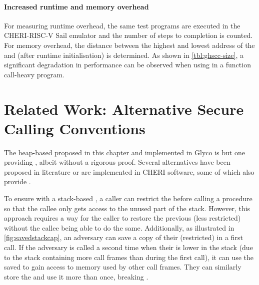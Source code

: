 \documentclass[main.tex]{subfiles}
\begin{document}
\paragraph{Increased runtime and memory overhead} For measuring runtime overhead, the same test programs are executed in the CHERI-RISC-V Sail emulator and the number of steps to completion is counted. For memory overhead, the distance between the highest and lowest address of the  and  (after runtime initialisation) is determined. As shown in \cref{tbl:ghscc-size}, a significant degradation in performance can be observed when using  in a function call-heavy program.

\section{Related Work: Alternative Secure Calling Conventions} \label{sct:alt-scc}
The heap-based  proposed in this chapter and implemented in Glyco is but one  providing , albeit without a rigorous proof. Several alternatives have been proposed in literature or are implemented in CHERI software, some of which also provide .

To ensure  with a stack-based , a caller can restrict the  before calling a procedure so that the callee only gets access to the unused part of the stack. However, this approach requires a way for the caller to restore the previous (less restricted)  without the callee being able to do the same. Additionally, as illustrated in \cref{fig:savedstackcap}, an adversary can save a copy of their (restricted)  in a first call. If the adversary is called a second time when their  is lower in the stack (due to the stack containing more call frames than during the first call), it can use the saved  to gain access to memory used by other call frames. They can similarly store the  and use it more than once, breaking .
\end{document}
